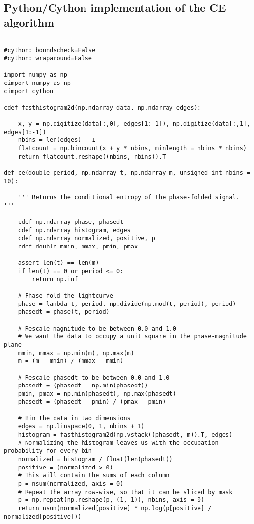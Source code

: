 \begin{appendices}
\chapter{Python/Cython implementation of the CE algorithm}
 
\begin{verbatim}

#cython: boundscheck=False
#cython: wraparound=False

import numpy as np
cimport numpy as np
cimport cython

cdef fasthistogram2d(np.ndarray data, np.ndarray edges):

	x, y = np.digitize(data[:,0], edges[1:-1]), np.digitize(data[:,1], edges[1:-1])
	nbins = len(edges) - 1
	flatcount = np.bincount(x + y * nbins, minlength = nbins * nbins)
	return flatcount.reshape((nbins, nbins)).T

def ce(double period, np.ndarray t, np.ndarray m, unsigned int nbins = 10):

	''' Returns the conditional entropy of the phase-folded signal. '''

	cdef np.ndarray phase, phasedt
	cdef np.ndarray histogram, edges
	cdef np.ndarray normalized, positive, p
	cdef double mmin, mmax, pmin, pmax

	assert len(t) == len(m)
	if len(t) == 0 or period <= 0:
		return np.inf

	# Phase-fold the lightcurve
	phase = lambda t, period: np.divide(np.mod(t, period), period)
	phasedt = phase(t, period)

	# Rescale magnitude to be between 0.0 and 1.0
	# We want the data to occupy a unit square in the phase-magnitude plane
	mmin, mmax = np.min(m), np.max(m)
	m = (m - mmin) / (mmax - mmin)

	# Rescale phasedt to be between 0.0 and 1.0
	phasedt = (phasedt - np.min(phasedt))
	pmin, pmax = np.min(phasedt), np.max(phasedt)
	phasedt = (phasedt - pmin) / (pmax - pmin)

	# Bin the data in two dimensions
	edges = np.linspace(0, 1, nbins + 1)
	histogram = fasthistogram2d(np.vstack((phasedt, m)).T, edges)
	# Normalizing the histogram leaves us with the occupation probability for every bin
	normalized = histogram / float(len(phasedt))
	positive = (normalized > 0)
	# This will contain the sums of each column
	p = nsum(normalized, axis = 0)
	# Repeat the array row-wise, so that it can be sliced by mask
	p = np.repeat(np.reshape(p, (1,-1)), nbins, axis = 0)
	return nsum(normalized[positive] * np.log(p[positive] / normalized[positive]))
  
\end{verbatim}

\end{appendices}